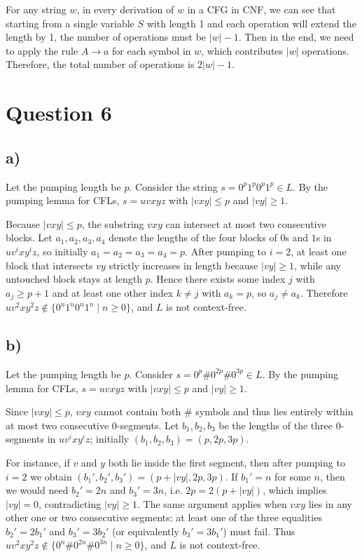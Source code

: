 \documentclass[a4paper, UTF-8]{article}
\theoremstyle{plain}
\begin{document}
For any string $w$, in every derivation of $w$ in a CFG in CNF, we can see that starting from a single variable $S$ with length 1 and each operation will extend the length by 1, the number of operations must be $|w|-1$. Then in the end, we need to apply the rule $A \to a$ for each symbol in $w$, which contributes $|w|$ operations. Therefore, the total number of operations is $2|w|-1$.

\section{Question 6}

\subsection{a)}

Let the pumping length be $p$. Consider the string $s = 0^p1^p0^p1^p \in L$. By the pumping lemma for CFLs, $s = uvxyz$ with $|vxy| \leq p$ and $|vy| \geq 1$.

Because $|vxy| \leq p$, the substring $vxy$ can intersect at most two consecutive blocks. Let $a_1,a_2,a_3,a_4$ denote the lengths of the four blocks of $0$s and $1$s in $uv^ixy^iz$, so initially $a_1=a_2=a_3=a_4=p$. After pumping to $i=2$, at least one block that intersects $vy$ strictly increases in length because $|vy| \geq 1$, while any untouched block stays at length $p$. Hence there exists some index $j$ with $a_j \geq p+1$ and at least one other index $k\neq j$ with $a_k = p$, so $a_j \neq a_k$. Therefore $uv^2xy^2z \notin \{0^n1^n0^n1^n \mid n \geq 0\}$, and $L$ is not context-free.

\subsection{b)}

Let the pumping length be $p$. Consider $s = 0^p\#0^{2p}\#0^{3p} \in L$. By the pumping lemma for CFLs, $s = uvxyz$ with $|vxy| \leq p$ and $|vy| \geq 1$.

Since $|vxy| \leq p$, $vxy$ cannot contain both $\#$ symbols and thus lies entirely within at most two consecutive $0$-segments. Let $b_1,b_2,b_3$ be the lengths of the three $0$-segments in $uv^ixy^iz$; initially $(b_1,b_2,b_3) = (p,2p,3p)$.

For instance, if $v$ and $y$ both lie inside the first segment, then after pumping to $i=2$ we obtain $(b_1',b_2',b_3') = (p+|vy|,2p,3p)$. If $b_1' = n$ for some $n$, then we would need $b_2' = 2n$ and $b_3' = 3n$, i.e. $2p = 2(p+|vy|)$, which implies $|vy| = 0$, contradicting $|vy| \geq 1$. The same argument applies when $vxy$ lies in any other one or two consecutive segments: at least one of the three equalities $b_2'=2b_1'$ and $b_3'=3b_2'$ (or equivalently $b_3'=3b_1'$) must fail. Thus $uv^2xy^2z \notin \{0^n\#0^{2n}\#0^{3n} \mid n \geq 0\}$, and $L$ is not context-free.
\end{document}

